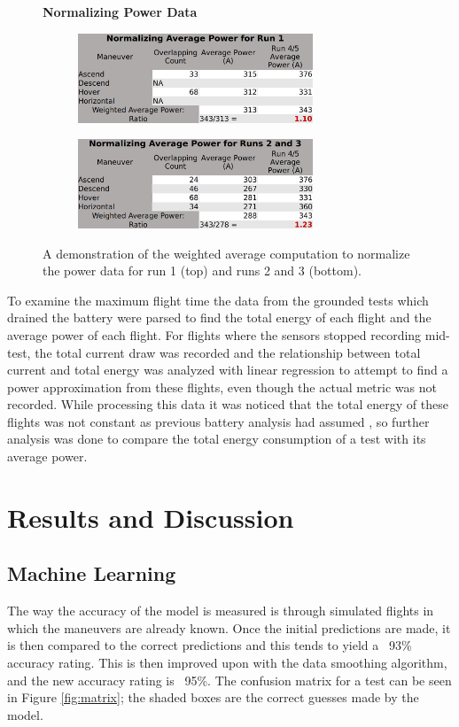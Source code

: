\documentclass{article}
\begin{document}
\begin{figure}
\centering
\large{\textbf{Normalizing Power Data}}\par
\begin{subfigure}[b]{0.5\textwidth}
  \centering
   \includegraphics[width=70mm]{images/Normalizing1.png}
  \label{fig:sub1}
\end{subfigure}%
\begin{subfigure}[b]{0.5\textwidth}
  \centering
  \includegraphics[width=70mm]{images/Normalizing2.png}
  \label{fig:sub2}
\end{subfigure}
\caption{A demonstration of the weighted average computation to normalize the power data for run 1 (top) and runs 2 and 3 (bottom).}
\label{fig:Norm}
\end{figure}

To examine the maximum flight time the data from the grounded tests which drained the battery were parsed to find the total energy of each flight and the average power of each flight. For flights where the sensors stopped recording mid-test, the total current draw was recorded and the relationship between total current and total energy was analyzed with linear regression to attempt to find a power approximation from these flights, even though the actual metric was not recorded. While processing this data it was noticed that the total energy of these flights was not constant as previous battery analysis had assumed \cite{Prasetia}, so further analysis was done to compare the total energy consumption of a test with its average power.


\section{Results and Discussion}


\subsection{Machine Learning}
The way the accuracy of the model is measured is through simulated flights in which the maneuvers are already known. Once the initial predictions are made, it is then compared to the correct predictions and this tends to yield a ~93\% accuracy rating. This is then improved upon with the data smoothing algorithm, and the new accuracy rating is ~95\%. The confusion matrix for a test can be seen in Figure \ref{fig:matrix}; the shaded boxes are the correct guesses made by the model. 
\end{document}
